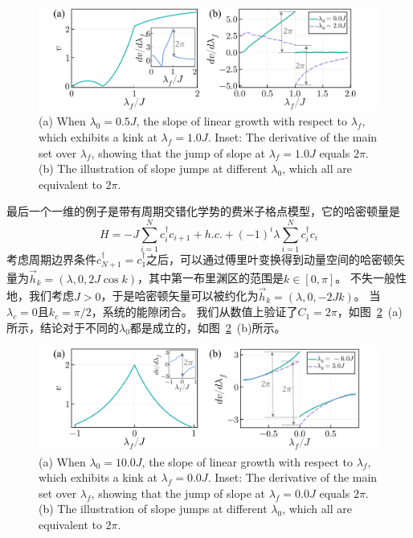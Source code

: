 			\begin{figure}[!htp]
				\centering
				\includegraphics[width=1\textwidth]{figures/QV_1D_SSH.pdf}
				\centering
				{(a) When $\lambda_0 = 0.5J$, the slope of linear growth with respect to $\lambda_f$, which exhibits a kink at $\lambda_f = 1.0J$.
					Inset: The derivative of the main set over $\lambda_f$, showing that the jump of slope at $\lambda_f = 1.0J$ equals $2\pi$.
					(b) The illustration of slope jumps at different $\lambda_0$, which all are equivalent to $2\pi$.}
				\label{Fig:QV_1D_SSH}
			\end{figure}
			
			最后一个一维的例子是带有周期交错化学势的费米子格点模型，它的哈密顿量是
			\begin{equation}
				H = -J\sum_{i=1}^{N}{c^\dagger_{i}c_{i+1}} + h.c. + (-1)^i\lambda\sum_{i=1}^{N}{c^\dagger_{i}c_{i}}
			\end{equation}
			考虑周期边界条件$c^\dagger_{N+1} = c^\dagger_{1}$之后，可以通过傅里叶变换得到动量空间的哈密顿矢量为$\vec{h}_k = (\lambda,0,2J\cos{k})$，其中第一布里渊区的范围是$k \in [0,\pi]$。
			不失一般性地，我们考虑$J > 0$，于是哈密顿矢量可以被约化为$\vec{h}_k = (\lambda,0,-2Jk)$。
			当$\lambda_c=0$且$k_c=\pi/2$，系统的能隙闭合。
			我们从数值上验证了$C_1 = 2\pi$，如图~\ref{Fig:QV_1D_AB}~(a)所示，结论对于不同的$\lambda_0$都是成立的，如图~\ref{Fig:QV_1D_AB}~(b)所示。
			
			\begin{figure}[!htp]
				\centering
				\includegraphics[width=1\textwidth]{figures/QV_1D_AB.pdf}
				\centering
				{(a) When $\lambda_0 = 10.0J$, the slope of linear growth with respect to $\lambda_f$, which exhibits a kink at $\lambda_f = 0.0J$.
					Inset: The derivative of the main set over $\lambda_f$, showing that the jump of slope at $\lambda_f = 0.0J$ equals $2\pi$.
					(b) The illustration of slope jumps at different $\lambda_0$, which all are equivalent to $2\pi$.}
				\label{Fig:QV_1D_AB}
			\end{figure}
		
